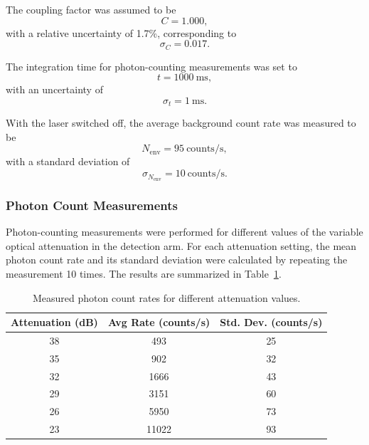 The coupling factor was assumed to be
\[
  C = 1.000,
\]
with a relative uncertainty of 1.7\%, corresponding to
\[
  \sigma_{C} = 0.017.
\]

The integration time for photon-counting measurements was set to
\[
  t = 1000~\text{ms},
\]
with an uncertainty of
\[
  \sigma_{t} = 1~\text{ms}.
\]

With the laser switched off, the average background count rate was
measured to be
\[
  N_{\mathrm{env}} = 95 ~\text{counts/s},
\]
with a standard deviation of
\[
  \sigma_{N_{\mathrm{env}}} = 10~\text{counts/s}.
\]

\subsubsection{Photon Count Measurements}

Photon-counting measurements were performed for different values of
the variable optical attenuation in the detection arm. For each
attenuation setting, the mean photon count rate and its standard
deviation were calculated by repeating the measurement 10 times. The
results are summarized in Table~\ref{tab:count_results}.


\begin{table}[h]
  \centering
  \begin{tabular}{ccc}
    \toprule
    \textbf{Attenuation (dB)} & \textbf{Avg Rate (counts/s)} &
    \textbf{Std. Dev. (counts/s)} \\
    \midrule
    38 & 493   & 25 \\
    35 & 902   & 32 \\
    32 & 1666  & 43 \\
    29 & 3151  & 60 \\
    26 & 5950  & 73 \\
    23 & 11022 & 93 \\
    \bottomrule
  \end{tabular}
  \caption{Measured photon count rates for different attenuation values.}
  \label{tab:count_results}
\end{table}

